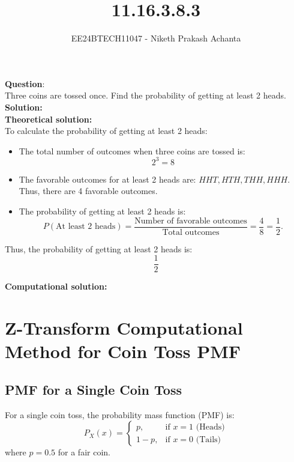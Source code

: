 \documentclass[journal]{IEEEtran}
\begin{document}
	
	
	\vspace{3cm}
	
	\title{11.16.3.8.3}
	\author{EE24BTECH11047 - Niketh Prakash Achanta }
	{\let\newpage\relax\maketitle}
	
	\renewcommand{\thefigure}{\theenumi}
	\renewcommand{\thetable}{\theenumi}
	\setlength{\intextsep}{10pt} %
	
	\renewcommand{\thetable}{\theenumi}
	
\textbf{Question}:\\
Three coins are tossed once. Find the probability of getting at least 2 heads.\\

\textbf{Solution: }\\

\textbf{Theoretical solution: }\\
To calculate the probability of getting at least 2 heads:

\begin{itemize}
    \item The total number of outcomes when three coins are tossed is:
    \[
    2^3 = 8
    \]
    \item The favorable outcomes for at least 2 heads are: \(HHT, HTH, THH, HHH\). Thus, there are 4 favorable outcomes.
    \item The probability of getting at least 2 heads is:
    \[
    P(\text{At least 2 heads}) = \frac{\text{Number of favorable outcomes}}{\text{Total outcomes}} = \frac{4}{8} = \frac{1}{2}.
    \]
\end{itemize}

Thus, the probability of getting at least 2 heads is:
\[
\boxed{\frac{1}{2}}
\]

\textbf{Computational solution: }\\

\section*{Z-Transform Computational Method for Coin Toss PMF}
\subsection*{PMF for a Single Coin Toss}
For a single coin toss, the probability mass function (PMF) is:
\[
P_X(x) =
\begin{cases}
p, & \text{if } x = 1 \text{ (Heads)} \\
1-p, & \text{if } x = 0 \text{ (Tails)}
\end{cases}
\]
where \(p = 0.5\) for a fair coin.
\end{document}
